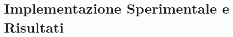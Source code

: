 \chapter{Implementazione Sperimentale e Risultati}
\label{cap:implementazione_sperimentale_risultati}

